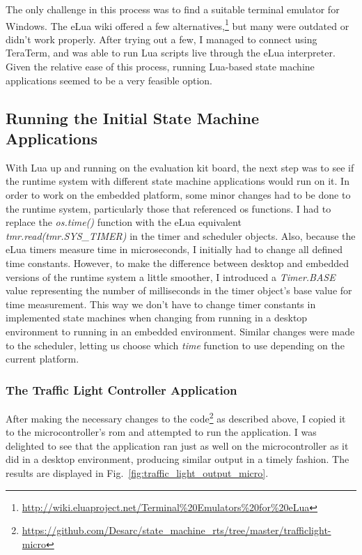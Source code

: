 \noindent
The only challenge in this process was to find a suitable terminal emulator for Windows. The eLua wiki offered a few alternatives,\footnote{\url{http://wiki.eluaproject.net/Terminal\%20Emulators\%20for\%20eLua}} but many were outdated or didn't work properly. After trying out a few, I managed to connect using TeraTerm, and was able to run Lua scripts live through the eLua interpreter. Given the relative ease of this process, running Lua-based state machine applications seemed to be a very feasible option.

\subsection{Running the Initial State Machine Applications}
\label{sec:running_initial}
With Lua up and running on the evaluation kit board, the next step was to see if the runtime system with different state machine applications would run on it. In order to work on the embedded platform, some minor changes had to be done to the runtime system, particularly those that referenced \gls{os} functions. I had to replace the \emph{os.time()} function with the eLua equivalent \emph{tmr.read(tmr.SYS\_TIMER)} in the timer and scheduler objects. Also, because the eLua timers measure time in microseconds, I initially had to change all defined time constants. However, to make the difference between desktop and embedded versions of the runtime system a little smoother, I introduced a \emph{Timer.BASE} value representing the number of milliseconds in the timer object's base value for time measurement. This way we don't have to change timer constants in implemented state machines when changing from running in a desktop environment to running in an embedded environment. Similar changes were made to the scheduler, letting us choose which \emph{time} function to use depending on the current platform.

\subsubsection{The Traffic Light Controller Application}
After making the necessary changes to the code\footnote{\url{https://github.com/Desarc/state_machine_rts/tree/master/trafficlight-micro}} as described above, I copied it to the microcontroller's \gls{rom} and attempted to run the application. I was delighted to see that the application ran just as well on the microcontroller as it did in a desktop environment, producing similar output in a timely fashion. The results are displayed in Fig.~\ref{fig:traffic_light_output_micro}.

